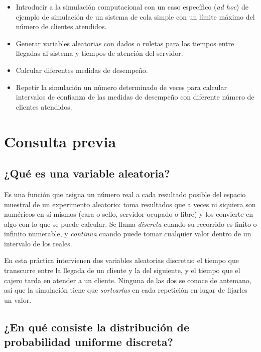 \documentclass[11pt,letterpaper]{article}
\begin{document}
\begin{itemize}[itemsep=2pt]
    \item Introducir a la simulación computacional con un caso específico (\emph{ad hoc}) de ejemplo de simulación de un sistema de cola simple con un límite máximo del número de clientes atendidos.
    \item Generar variables aleatorias con dados o ruletas para los tiempos entre llegadas al sistema y tiempos de atención del servidor.
    \item Calcular diferentes medidas de desempeño.
    \item Repetir la simulación un número determinado de veces para calcular intervalos de confianza de las medidas de desempeño con diferente número de clientes atendidos.
\end{itemize}

\section{Consulta previa}

\subsection{¿Qué es una variable aleatoria?}

Es una función que asigna un número real a cada resultado posible del espacio muestral de un experimento aleatorio: toma resultados que a veces ni siquiera son numéricos en sí mismos (cara o sello, servidor ocupado o libre) y los convierte en algo con lo que se puede calcular. Se llama \emph{discreta} cuando su recorrido es finito o infinito numerable, y \emph{continua} cuando puede tomar cualquier valor dentro de un intervalo de los reales.

En esta práctica intervienen dos variables aleatorias discretas: el tiempo que transcurre entre la llegada de un cliente y la del siguiente, y el tiempo que el cajero tarda en atender a un cliente. Ninguna de las dos se conoce de antemano, así que la simulación tiene que \emph{sortearlas} en cada repetición en lugar de fijarles un valor.

\subsection{¿En qué consiste la distribución de probabilidad uniforme discreta?}
\end{document}
